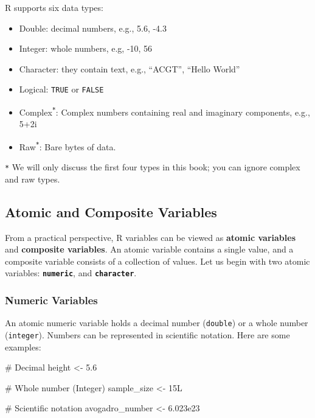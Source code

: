 \documentclass[
  letterpaper,
  DIV=11,
  numbers=noendperiod]{scrreprt}
\newenvironment{Shaded}{\begin{snugshade}}{\end{snugshade}}
\newcommand{\CommentTok}[1]{\textcolor[rgb]{0.37,0.37,0.37}{#1}}
\newcommand{\DecValTok}[1]{\textcolor[rgb]{0.68,0.00,0.00}{#1}}
\newcommand{\FloatTok}[1]{\textcolor[rgb]{0.68,0.00,0.00}{#1}}
\newcommand{\NormalTok}[1]{\textcolor[rgb]{0.00,0.23,0.31}{#1}}
\newcommand{\OtherTok}[1]{\textcolor[rgb]{0.00,0.23,0.31}{#1}}
\begin{document}
R supports six data types:

\begin{itemize}
\item
  Double: decimal numbers, e.g., 5.6, -4.3
\item
  Integer: whole numbers, e.g, -10, 56
\item
  Character: they contain text, e.g., ``ACGT'', ``Hello World''
\item
  Logical: \texttt{TRUE} or \texttt{FALSE}
\item
  Complex\textsuperscript{\texttt{*}}: Complex numbers containing real
  and imaginary components, e.g., 5+2i
\item
  Raw\textsuperscript{\texttt{*}}: Bare bytes of data.
\end{itemize}

\texttt{*} We will only discuss the first four types in this book; you
can ignore complex and raw types.

\subsection{Atomic and Composite
Variables}\label{sec-01-atomic-and-composite-variables}

From a practical perspective, R variables can be viewed as
\textbf{atomic variables} and \textbf{composite variables}. An atomic
variable contains a single value, and a composite variable consists of a
collection of values. Let us begin with two atomic variables:
\textbf{\texttt{numeric}}, and \textbf{\texttt{character}}.

\subsubsection{Numeric Variables}\label{numeric-variables}

An atomic numeric variable holds a decimal number (\texttt{double}) or a
whole number (\texttt{integer}). Numbers can be represented in
scientific notation. Here are some examples:

\begin{Shaded}
\begin{Highlighting}[]
\CommentTok{\# Decimal}
\NormalTok{height }\OtherTok{\textless{}{-}} \FloatTok{5.6}

\CommentTok{\# Whole number (Integer)}
\NormalTok{sample\_size }\OtherTok{\textless{}{-}} \DecValTok{15}\NormalTok{L}

\CommentTok{\# Scientific notation}
\NormalTok{avogadro\_number }\OtherTok{\textless{}{-}} \FloatTok{6.023e23}
\end{Highlighting}
\end{Shaded}
\end{document}
